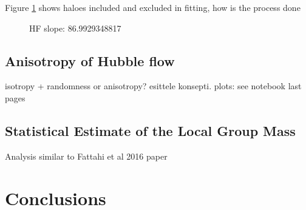\documentclass[english, oneside]{HYgradu}
\begin{document}
Figure \ref{fig:hubblefit} shows haloes included and excluded in fitting, how is the process done

\begin{figure}
    \centering
    
    \caption{HF slope: 86.9929348817}\label{fig:hubblefit}
\end{figure}

%   

\section{Anisotropy of Hubble flow}
isotropy + randomness or anisotropy? esittele konsepti. plots: see notebook last pages

\section{Statistical Estimate of the Local Group Mass}
Analysis similar to Fattahi et al 2016 paper


%
%

\chapter{Conclusions}






\clearpage
{} %


\end{document}
